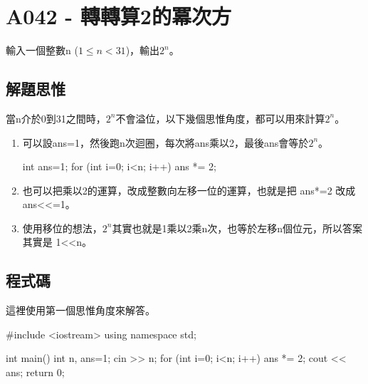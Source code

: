 \section{A042 - 轉轉算2的冪次方}
輸入一個整數n ($1\le n<31$)，輸出$2^n$。

\subsection{解題思惟}
當n介於0到31之間時，$2^n$不會溢位，以下幾個思惟角度，都可以用來計算$2^n$。
\begin{enumerate}
\item 可以設ans=1，然後跑n次迴圈，每次將ans乘以2，最後ans會等於$2^n$。	
\begin{inside}
	int ans=1;
	for (int i=0; i<n; i++) ans *= 2;
\end{inside}
\item 也可以把乘以2的運算，改成整數向左移一位的運算，也就是把 ans*=2 改成 ans<{}<=1。
\item 使用移位的想法，$2^n$其實也就是1乘以2乘n次，也等於左移n個位元，所以答案其實是 1<{}<n。
\end{enumerate}

\subsection{程式碼}
這裡使用第一個思惟角度來解答。
\begin{cppcode}
#include <iostream>
using namespace std;

int main() 
{
	int n, ans=1;
	cin >> n;
	for (int i=0; i<n; i++) ans *= 2;
	cout << ans;
	return 0;
}
\end{cppcode}
